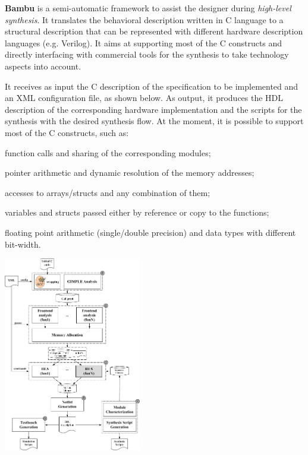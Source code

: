 {\bfseries Bambu} is a semi-\/automatic framework to assist the designer during {\itshape high-\/level synthesis}. It translates the behavioral description written in C language to a structural description that can be represented with different hardware description languages (e.\+g. Verilog). It aims at supporting most of the C constructs and directly interfacing with commercial tools for the synthesis to take technology aspects into account.

It receives as input the C description of the specification to be implemented and an X\+ML configuration file, as shown below. As output, it produces the H\+DL description of the corresponding hardware implementation and the scripts for the synthesis with the desired synthesis flow. At the moment, it is possible to support most of the C constructs, such as\+:
\begin{DoxyItemize}
\item function calls and sharing of the corresponding modules;
\item pointer arithmetic and dynamic resolution of the memory addresses;
\item accesses to arrays/structs and any combination of them;
\item variables and structs passed either by reference or copy to the functions;
\item floating point arithmetic (single/double precision) and data types with different bit-\/width.

 
\begin{DoxyImage}
\includegraphics[width=6cm]{bambu_methodology.png}
\end{DoxyImage}

\end{DoxyItemize}

